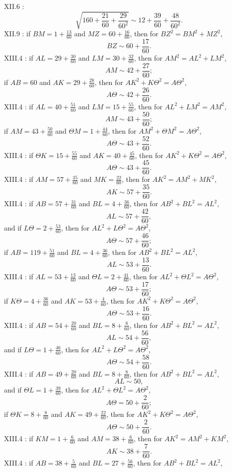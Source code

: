 \documentclass{amsart}
\theoremstyle{definition}
\begin{document}
XII.6 \cite[p.~581]{almagest}:
\[
\sqrt{160+\frac{21}{60}+\frac{29}{60^2}} \sim 12+\frac{39}{60}+\frac{48}{60^2}.
\]
XII.9 \cite[p.~591]{almagest}: if $BM=1+\frac{13}{60}$ and $MZ=60+\frac{16}{60}$, then for $BZ^2=BM^2+MZ^2$,
\[
BZ \sim 60+\frac{17}{60}.
\]
XIII.4 \cite[p.~608]{almagest}: if $AL=29+\frac{30}{60}$ and $LM=30+\frac{32}{60}$, then for $AM^2=AL^2+LM^2$,
\[
AM \sim 42+\frac{27}{60};
\]
if $AB=60$ and $AK=29+\frac{28}{60}$, then for $AK^2+K\Theta^2=A\Theta^2$,
\[
A\Theta \sim 42+\frac{26}{60}.
\]
XIII.4 \cite[p.~610]{almagest}: if $AL=40+\frac{51}{60}$ and $LM=15+\frac{55}{60}$, then for $AL^2+LM^2=AM^2$,
\[
AM \sim 43+\frac{50}{60};
\]
if $AM=43+\frac{50}{60}$ and $\Theta M = 1+\frac{44}{60}$, then for $AM^2+\Theta M^2=A \Theta^2$,
\[
A\Theta \sim 43+\frac{52}{60}.
\]
XIII.4 \cite[p.~611]{almagest}: if $\Theta K = 15+\frac{55}{60}$ and $AK=40+\frac{45}{60}$, then for
$AK^2+K\Theta^2 = A\Theta^2$,
\[
A\Theta \sim 43+\frac{45}{60}.
\]
XIII.4 \cite[p.~613]{almagest}: if $AM=57+\frac{35}{60}$ and $MK=\frac{22}{60}$, then for $AK^2=AM^2+MK^2$,
\[
AK \sim 57+\frac{35}{60}.
\]
XIII.4 \cite[p.~614]{almagest}: if $AB=57+\frac{31}{60}$ and $BL=4+\frac{36}{60}$, then for $AB^2+BL^2=AL^2$,
\[
AL \sim 57+\frac{42}{60},
\]
and if $L\Theta = 2+\frac{53}{60}$, then for $AL^2+L\Theta^2=A\Theta^2$,
\[
A\Theta \sim 57+\frac{46}{60};
\]
if $AB=119+\frac{51}{60}$ and $BL=4+\frac{36}{60}$, then for $AB^2+BL^2=AL^2$,
\[
AL \sim 53+\frac{13}{60}.
\]
XIII.4 \cite[p.~615]{almagest}: if $AL=53+\frac{13}{60}$ and $\Theta L = 2+\frac{41}{60}$, then for $AL^2+\Theta L^2=
A\Theta^2$,
\[
A\Theta \sim 53+\frac{17}{60};
\]
if $K\Theta = 4+\frac{36}{60}$ and $AK=53+\frac{4}{60}$, then for $AK^2+K\Theta^2=A\Theta^2$,
\[
A\Theta \sim 53+\frac{16}{60}.
\]
XIII.4 \cite[p.~617]{almagest}: if $AB=54+\frac{20}{60}$ and $BL=8+\frac{8}{60}$, then for $AB^2+BL^2=AL^2$,
\[
AL \sim 54+\frac{56}{60},
\]
and if $L\Theta = 1+\frac{46}{60}$, then for $AL^2+L\Theta^2=A\Theta^2$,
\[
A\Theta \sim 54+\frac{58}{60}.
\]
XIII.4 \cite[p.~618]{almagest}: if $AB=49+\frac{20}{60}$ and $BL=8+\frac{8}{60}$, then for
$AB^2+BL^2=AL^2$,
\[
AL \sim 50,
\]
and if $\Theta L = 1+\frac{39}{60}$, then for $AL^2+\Theta L^2=A\Theta^2$,
\[
A\Theta = 50+\frac{2}{60};
\]
if $\Theta K = 8+\frac{8}{60}$ and $AK=49+\frac{22}{60}$, then for $AK^2+K\Theta^2=A\Theta^2$,
\[
A\Theta \sim 50+\frac{2}{60}.
\]
XIII.4 \cite[p.~619]{almagest}: if $KM=1+\frac{6}{60}$ and $AM=38+\frac{6}{60}$, then for $AK^2=AM^2+KM^2$,
\[
AK \sim 38+\frac{7}{60}.
\]
XIII.4 \cite[p.~620]{almagest}: if $AB=38+\frac{5}{60}$ and $BL=27+\frac{56}{60}$, then for $AB^2+BL^2=AL^2$,
\end{document}
